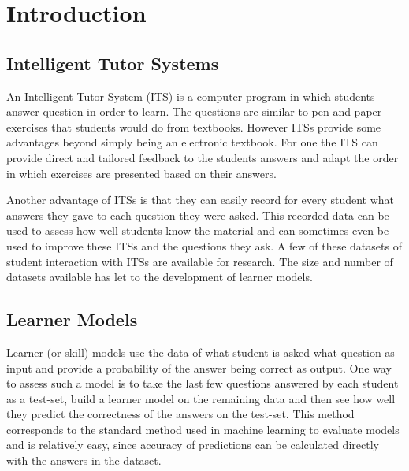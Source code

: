 \documentclass{scrartcl}
\begin{document}
 




\tableofcontents

\newpage

\nocite{labelcombi}
\nocite{lftransfer}
\nocite{importance}
\nocite{knowledgeproblem}
\nocite{modelreview}
\nocite{eirt}
\nocite{pfa}
\nocite{ktpfa}
\nocite{skillcombi}
\nocite{lfa}
\nocite{blackart}
\nocite{hambleton}
\nocite{newirt}
\nocite{bridge}
\nocite{ct}
\nocite{algebra}
\nocite{assessment}


\section{Introduction}

\subsection{Intelligent Tutor Systems}
An Intelligent Tutor System (ITS) is a computer program in which students answer question in order to learn. The questions are similar to pen and paper exercises that students would do from textbooks. However ITSs provide some advantages beyond simply being an electronic textbook. For one the ITS can provide direct and tailored feedback to the students answers and adapt the order in which exercises are presented based on their answers. 

Another advantage of ITSs is that they can easily record for every student what answers they gave to each question they were asked. This recorded data can be used to assess how well students know the material and can sometimes even be used to improve these ITSs and the questions they ask. A few of these datasets of student interaction with ITSs are available for research. The size and number of datasets available has let to the development of learner models.

\subsection{Learner Models}
Learner (or skill) models use the data of what student is asked what question as input and provide a probability of the answer being correct as output. One way to assess such a model is to take the last few questions answered by each student as a test-set, build a learner model on the remaining data and then see how well they predict the correctness of the answers on the test-set. This method corresponds to the standard method used in machine learning to evaluate models and is relatively easy, since accuracy of predictions can be calculated directly with the answers in the dataset.
\end{document}
